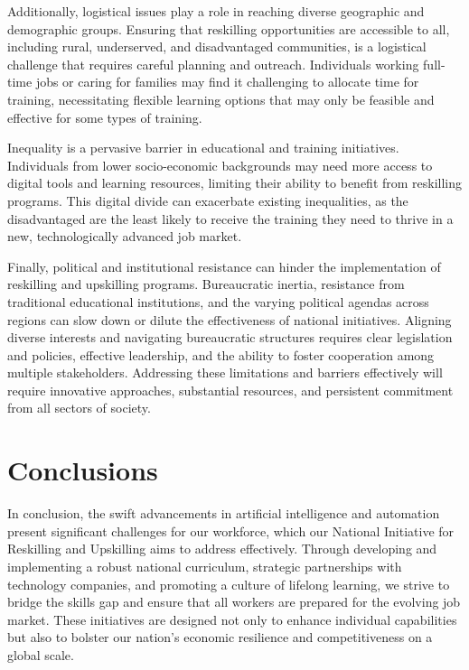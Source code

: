 \documentclass[11pt]{article}
\begin{document}
Additionally, logistical issues play a role in reaching diverse geographic and demographic groups. Ensuring that reskilling opportunities are accessible to all, including rural, underserved, and disadvantaged communities, is a logistical challenge that requires careful planning and outreach. Individuals working full-time jobs or caring for families may find it challenging to allocate time for training, necessitating flexible learning options that may only be feasible and effective for some types of training.

Inequality is a pervasive barrier in educational and training initiatives. Individuals from lower socio-economic backgrounds may need more access to digital tools and learning resources, limiting their ability to benefit from reskilling programs. This digital divide can exacerbate existing inequalities, as the disadvantaged are the least likely to receive the training they need to thrive in a new, technologically advanced job market.

Finally, political and institutional resistance can hinder the implementation of reskilling and upskilling programs. Bureaucratic inertia, resistance from traditional educational institutions, and the varying political agendas across regions can slow down or dilute the effectiveness of national initiatives. Aligning diverse interests and navigating bureaucratic structures requires clear legislation and policies, effective leadership, and the ability to foster cooperation among multiple stakeholders. Addressing these limitations and barriers effectively will require innovative approaches, substantial resources, and persistent commitment from all sectors of society.

\section{Conclusions}

In conclusion, the swift advancements in artificial intelligence and automation present significant challenges for our workforce, which our National Initiative for Reskilling and Upskilling aims to address effectively. Through developing and implementing a robust national curriculum, strategic partnerships with technology companies, and promoting a culture of lifelong learning, we strive to bridge the skills gap and ensure that all workers are prepared for the evolving job market. These initiatives are designed not only to enhance individual capabilities but also to bolster our nation's economic resilience and competitiveness on a global scale.
\end{document}
